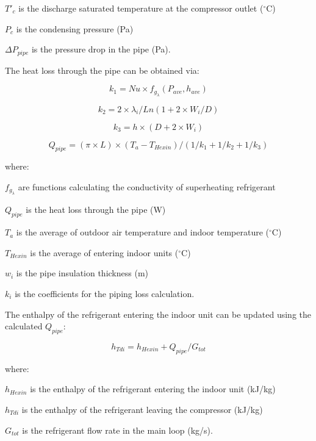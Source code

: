 \(T'_c\) is the discharge saturated temperature at the compressor outlet (\(^{\circ}\)C)

\(P_c\) is the condensing pressure (Pa)

\(\Delta{P_{pipe}}\) is the pressure drop in the pipe (Pa).

The heat loss through the pipe can be obtained via:

\begin{equation}
k_1 = Nu\times{f_{g_\lambda}(P_{ave},h_{ave})}
\end{equation}

\begin{equation}
k_2 = 2\times{\lambda_i}/Ln(1+2\times{W_i}/D)
\end{equation}

\begin{equation}
k_3 = h\times(D+2\times{W_i})
\end{equation}

\begin{equation}
Q_{pipe} = (\pi\times{L})\times(T_a-T_{Hexin})/(1/k_1+1/k_2+1/k_3)
\end{equation}

where:

\(f_{g_\lambda}\) are functions calculating the conductivity of superheating refrigerant

\(Q_{pipe}\) is the heat loss through the pipe (W)

\(T_a\) is the average of outdoor air temperature and indoor temperature (\(^{\circ}\)C)

\(T_{Hexin}\) is the average of entering indoor units (\(^{\circ}\)C)

\(w_i\) is the pipe insulation thickness (m)

\(k_i\) is the coefficients for the piping loss calculation.

The enthalpy of the refrigerant entering the indoor unit can be updated using the calculated \(Q_{pipe}\):

\begin{equation}
h_{Tdi} = h_{Hexin}+Q_{pipe}/G_{tot}
\end{equation}

where:

\(h_{Hexin}\) is the enthalpy of the refrigerant entering the indoor unit (kJ/kg)

\(h_{Tdi}\) is the enthalpy of the refrigerant leaving the compressor (kJ/kg)

\(G_{tot}\) is the refrigerant flow rate in the main loop (kg/s).

